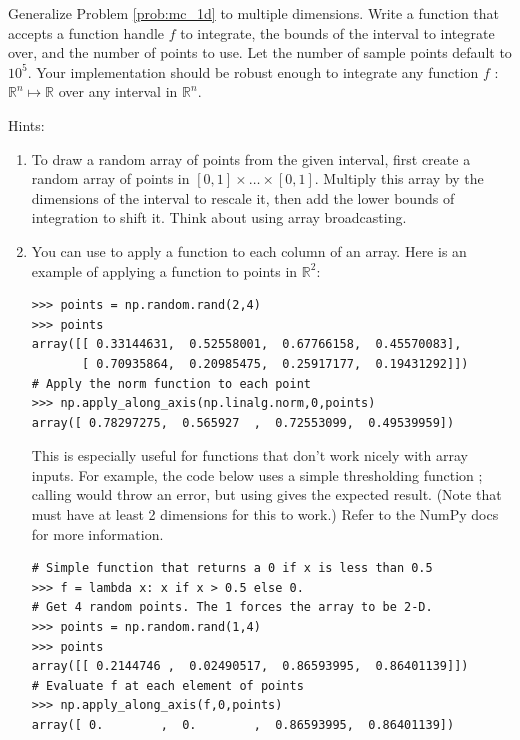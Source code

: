 \begin{problem}
\label{prob:mc}
Generalize Problem \ref{prob:mc_1d} to multiple dimensions.
Write a function that accepts a function handle $f$ to integrate, the bounds of the interval to integrate over, and the number of points to use.
Let the number of sample points default to $10^5$.
Your implementation should be robust enough to integrate any function $f$ : $\mathbb{R}^n \mapsto \mathbb{R}$ over any interval in $\mathbb{R}^n$.

Hints:
\begin{enumerate}
\item To draw a random array of points from the given interval, first create a random array of points in $[0,1] \times \ldots \times [0,1]$.
Multiply this array by the dimensions of the interval to rescale it, then add the lower bounds of integration to shift it.
Think about using array broadcasting.

\item You can use  to apply a function to each column of an array.
Here is an example of applying a function to points in $\mathbb{R}^2$:

\begin{lstlisting}
>>> points = np.random.rand(2,4)
>>> points
array([[ 0.33144631,  0.52558001,  0.67766158,  0.45570083],
       [ 0.70935864,  0.20985475,  0.25917177,  0.19431292]])
# Apply the norm function to each point
>>> np.apply_along_axis(np.linalg.norm,0,points)
array([ 0.78297275,  0.565927  ,  0.72553099,  0.49539959])
\end{lstlisting}

This is especially useful for functions that don't work nicely with array inputs.
For example, the code below uses a simple thresholding function ; calling  would throw an error, but using  gives the expected result.
(Note that  must have at least 2 dimensions for this to work.)
Refer to the NumPy docs for more information.

\begin{lstlisting}
# Simple function that returns a 0 if x is less than 0.5
>>> f = lambda x: x if x > 0.5 else 0.
# Get 4 random points. The 1 forces the array to be 2-D.
>>> points = np.random.rand(1,4)
>>> points
array([[ 0.2144746 ,  0.02490517,  0.86593995,  0.86401139]])
# Evaluate f at each element of points
>>> np.apply_along_axis(f,0,points)
array([ 0.        ,  0.        ,  0.86593995,  0.86401139])
\end{lstlisting}


\end{enumerate}
\end{problem}

